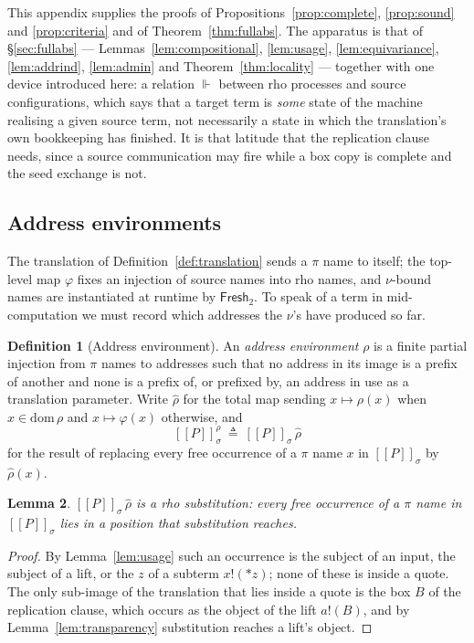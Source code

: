 \documentclass[11pt]{article}
\theoremstyle{definition}
\newtheorem{definition}{Definition}[section]
\theoremstyle{plain}
\newtheorem{lemma}[definition]{Lemma}
\theoremstyle{remark}
\newcommand{\drp}[1]{{*}#1}
\newcommand{\out}[2]{#1!(#2)}
\newcommand{\enc}[1]{[\![#1]\!]}
\newcommand{\Frsh}{\mathsf{Fresh}_2}
\newcommand{\real}{\Vdash}
\newcommand{\dom}{\mathrm{dom}\,}
\begin{document}
This appendix supplies the proofs of Propositions~\ref{prop:complete},
\ref{prop:sound} and \ref{prop:criteria} and of
Theorem~\ref{thm:fullabs}. The apparatus is that of \S\ref{sec:fullabs}
--- Lemmas~\ref{lem:compositional}, \ref{lem:usage},
\ref{lem:equivariance}, \ref{lem:addrind}, \ref{lem:admin} and
Theorem~\ref{thm:locality} --- together with one device introduced here:
a relation $\real$ between rho processes and source configurations,
which says that a target term is \emph{some} state of the machine
realising a given source term, not necessarily a state in which the
translation's own bookkeeping has finished. It is that latitude that the
replication clause needs, since a source communication may fire while a
box copy is complete and the seed exchange is not.

\subsection{Address environments}

The translation of Definition~\ref{def:translation} sends a $\pi$ name to
itself; the top-level map $\varphi$ fixes an injection of source names
into rho names, and $\nu$-bound names are instantiated at runtime by
$\Frsh$. To speak of a term in mid-computation we must record which
addresses the $\nu$'s have produced so far.

\begin{definition}[Address environment]\label{def:aenv}
An \emph{address environment} $\rho$ is a finite partial injection from
$\pi$ names to addresses such that no address in its image is a prefix of
another and none is a prefix of, or prefixed by, an address in use as a
translation parameter. Write $\hat\rho$ for the total map sending
$x \mapsto \rho(x)$ when $x \in \dom\rho$ and $x \mapsto \varphi(x)$
otherwise, and
\[
  \enc{P}^\rho_\sigma \ \triangleq\ \enc{P}_\sigma\,\hat\rho
\]
for the result of replacing every free occurrence of a $\pi$ name $x$ in
$\enc{P}_\sigma$ by $\hat\rho(x)$.
\end{definition}

\begin{lemma}\label{lem:aenv-subst}
$\enc{P}_\sigma\,\hat\rho$ is a rho substitution: every free occurrence of
a $\pi$ name in $\enc{P}_\sigma$ lies in a position that substitution
reaches.
\end{lemma}

\begin{proof}
By Lemma~\ref{lem:usage} such an occurrence is the subject of an input,
the subject of a lift, or the $z$ of a subterm $\out{x}{\drp{z}}$; none of
these is inside a quote. The only sub-image of the translation that lies
inside a quote is the box $B$ of the replication clause, which occurs as
the object of the lift $\out{a}{B}$, and by
Lemma~\ref{lem:transparency} substitution reaches a lift's object.
\end{proof}
\end{document}
